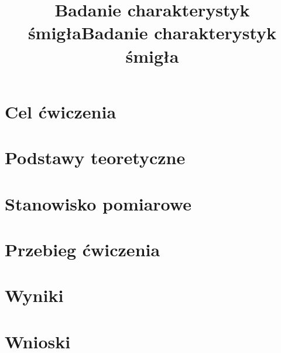\documentclass[theme = light]{sprawozdanie}
\title{Badanie charakterystyk śmigła}
\author{ }
\begin{document}
\maketitle
%
\title{Badanie charakterystyk śmigła}
%
%
\tableofcontents\hfill\vfill
%


%
\vfill

%
%
\newpage
\section{Cel ćwiczenia} \label{sec:podstawy}
    
\section{Podstawy teoretyczne}
    
\section{Stanowisko pomiarowe}
    
\section{Przebieg ćwiczenia}
    
\newpage
\section{Wyniki\label{sec:wyniki}}
    
\section{Wnioski}
    
%
\end{document}
